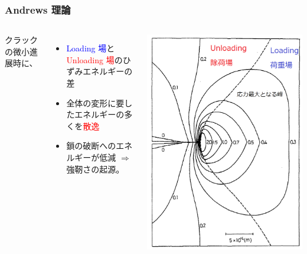 \documentclass[12pt, dvipdfmx]{beamer}
\begin{document}
\begin{frame}[noframenumbering]
	\frametitle{Andrews 理論\cite{andrews}}
	\begin{columns}[totalwidth=\textwidth]
			クラックの微小進展時に、
			\begin{itemize}
				\item
				\textcolor{blue}{Loading 場}と\textcolor{red}{Unloading 場}のひずみエネルギーの差
				\item
				全体の変形に要したエネルギーの多くを\textcolor{red}{散逸}
				\item
				鎖の破断へのエネルギーが低減 $\Rightarrow$ \alert{強靭さの起源。}
			\end{itemize}	
			\includegraphics[width=.85\textwidth]{crack.png}     
	\end{columns}
\end{frame}
\end{document}

